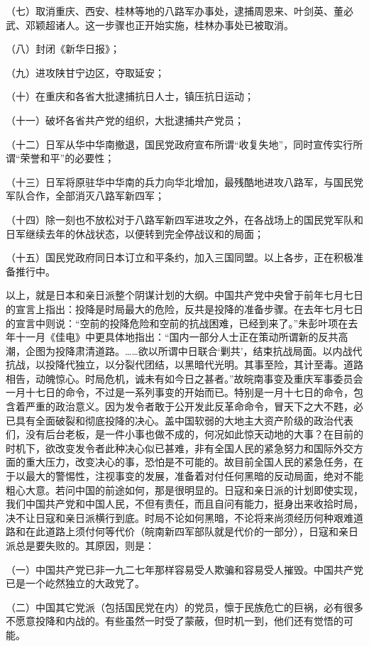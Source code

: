 （七）取消重庆、西安、桂林等地的八路军办事处，逮捕周恩来、叶剑英、董必武、邓颖超诸人。这一步骤也正开始实施，桂林办事处已被取消。

（八）封闭《新华日报》；

（九）进攻陕甘宁边区，夺取延安；

（十）在重庆和各省大批逮捕抗日人士，镇压抗日运动；

（十一）破坏各省共产党的组织，大批逮捕共产党员；

（十二）日军从华中华南撤退，国民党政府宣布所谓“收复失地”，同时宣传实行所谓“荣誉和平”的必要性；

（十三）日军将原驻华中华南的兵力向华北增加，最残酷地进攻八路军，与国民党军队合作，全部消灭八路军新四军；

（十四）除一刻也不放松对于八路军新四军进攻之外，在各战场上的国民党军队和日军继续去年的休战状态，以便转到完全停战议和的局面；

（十五）国民党政府同日本订立和平条约，加入三国同盟。以上各步，正在积极准备推行中。

以上，就是日本和亲日派整个阴谋计划的大纲。中国共产党中央曾于前年七月七日的宣言上指出：投降是时局最大的危险，反共是投降的准备步骤。在去年七月七日的宣言中则说：“空前的投降危险和空前的抗战困难，已经到来了。”朱彭叶项在去年十一月《佳电》中更具体地指出：“国内一部分人士正在策动所谓新的反共高潮，企图为投降肃清道路。……欲以所谓中日联合‘剿共’，结束抗战局面。以内战代抗战，以投降代独立，以分裂代团结，以黑暗代光明。其事至险，其计至毒。道路相告，动魄惊心。时局危机，诚未有如今日之甚者。”故皖南事变及重庆军事委员会一月十七日的命令，不过是一系列事变的开始而已。特别是一月十七日的命令，包含着严重的政治意义。因为发令者敢于公开发此反革命命令，冒天下之大不韪，必已具有全面破裂和彻底投降的决心。盖中国软弱的大地主大资产阶级的政治代表们，没有后台老板，是一件小事也做不成的，何况如此惊天动地的大事？在目前的时机下，欲改变发令者此种决心似已甚难，非有全国人民的紧急努力和国际外交方面的重大压力，改变决心的事，恐怕是不可能的。故目前全国人民的紧急任务，在于以最大的警惕性，注视事变的发展，准备着对付任何黑暗的反动局面，绝对不能粗心大意。若问中国的前途如何，那是很明显的。日寇和亲日派的计划即使实现，我们中国共产党和中国人民，不但有责任，而且自问有能力，挺身出来收拾时局，决不让日寇和亲日派横行到底。时局不论如何黑暗，不论将来尚须经历何种艰难道路和在此道路上须付何等代价（皖南新四军部队就是代价的一部分），日寇和亲日派总是要失败的。其原因，则是：

（一）中国共产党已非一九二七年那样容易受人欺骗和容易受人摧毁。中国共产党已是一个屹然独立的大政党了。

（二）中国其它党派（包括国民党在内）的党员，懔于民族危亡的巨祸，必有很多不愿意投降和内战的。有些虽然一时受了蒙蔽，但时机一到，他们还有觉悟的可能。

